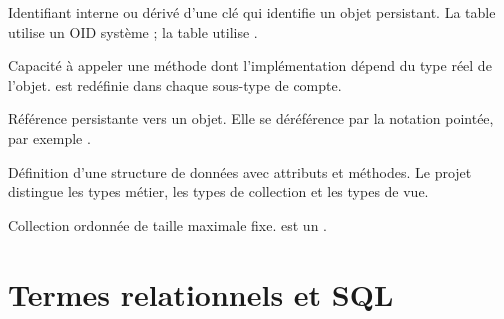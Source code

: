 \begin{description}[leftmargin=2.6em,style=nextline]
\item[OID (identifiant objet).]
Identifiant interne ou dérivé d'une clé qui identifie un objet persistant. La
table  utilise un OID système ; la table  utilise
.

\item[Polymorphisme.]
Capacité à appeler une méthode dont l'implémentation dépend du type réel de
l'objet.  est redéfinie dans chaque sous-type de compte.

\item[REF.]
Référence persistante vers un objet. Elle se déréférence par la notation
pointée, par exemple .

\item[Type objet.]
Définition d'une structure de données avec attributs et méthodes. Le projet
distingue les types métier, les types de collection et les types de vue.

\item[VARRAY.]
Collection ordonnée de taille maximale fixe.  est un
.

\end{description}

\section{Termes relationnels et SQL}

